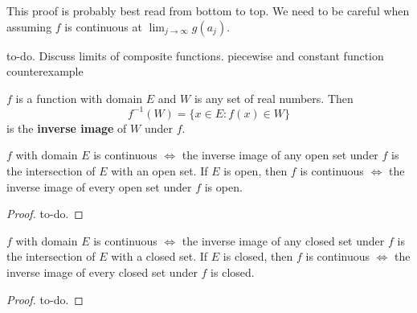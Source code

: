 \documentclass{article}
\begin{document}
This proof is probably best read from bottom to top. We need to be careful when 
assuming \( f \) is continuous at \( \lim_{j \to \infty} g(a_j) \). 

\begin{remark}
    to-do. Discuss limits of composite functions. piecewise and constant function 
    counterexample
\end{remark}

\begin{definition}
    \( f \) is a function with domain \( E \) and \( W \) is any set of real numbers.
    Then 
    \[
        f^{-1}(W) = \{ x \in E : f(x) \in W \}
    \] 
    is the \textbf{inverse image} of \( W \) under \( f \).
\end{definition}

\begin{theorem}
    \( f \) with domain \( E \) is continuous \( \iff \) the inverse image of any open set
    under \( f \) is the intersection of \( E \) with an open set.
    If \( E \) is open, then \( f \) is continuous \( \iff \) the inverse image of every open
    set under \( f \) is open.
\end{theorem}

\begin{proof}
    to-do.
\end{proof}

\begin{corollary}
    \( f \) with domain \( E \) is continuous \( \iff \) the inverse image of any closed set
    under \( f \) is the intersection of \( E \) with a closed set.
    If \( E \) is closed, then \( f \) is continuous \( \iff \) the inverse image of every closed
    set under \( f \) is closed.
\end{corollary}

\begin{proof}
    to-do.
\end{proof}
\end{document}
